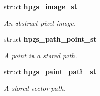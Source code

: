 \begin{CompactItemize}
struct {\bf hpgs\_\-image\_\-st}
\begin{CompactList}\small\item\em An abstract pixel image. \item\end{CompactList}\item 
struct {\bf hpgs\_\-path\_\-point\_\-st}
\begin{CompactList}\small\item\em A point in a stored path. \item\end{CompactList}\item 
struct {\bf hpgs\_\-paint\_\-path\_\-st}
\begin{CompactList}\small\item\em A stored vector path. \item\end{CompactList}\end{CompactItemize}
